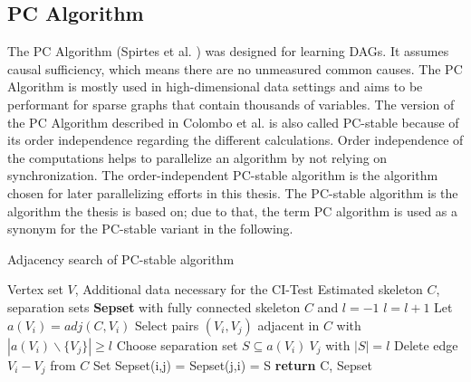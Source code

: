 \subsection{PC Algorithm}
The PC Algorithm (Spirtes et al. \cite{spirtesCausationPredictionSearch1993}) was designed for learning DAGs. It assumes causal sufficiency, which means there are no unmeasured common causes. The PC Algorithm is mostly used in high-dimensional data settings and aims to be performant for sparse graphs that contain thousands of variables. \cite{kalischUnderstandingHumanFunctioning2010}
The version of the PC Algorithm described in Colombo et al. \cite{colomboOrderIndependentConstraintBasedCausal} is also called PC-stable because of its order independence regarding the different calculations. Order independence of the computations helps to parallelize an algorithm by not relying on synchronization. The order-independent PC-stable algorithm is the algorithm chosen for later parallelizing efforts in this thesis. The PC-stable algorithm is the algorithm the thesis is based on; due to that, the term PC algorithm is used as a synonym for the PC-stable variant in the following.

\begin{algorithm}
    \caption{Adjacency search of PC-stable algorithm \cite{colomboOrderIndependentConstraintBasedCausal}}
    \label{alg:pcstable}
    \begin{algorithmic}[1]
    \Require Vertex set $V$, Additional data necessary for the CI-Test
    \Ensure Estimated skeleton $C$, separation sets \textbf{Sepset}
    \State with fully connected skeleton $C$ and $l = -1$
    \Repeat 
        \State $l=l+1$
            \State Let $a(V_i) = adj(C,V_i)$
        \EndFor
        \Repeat
            \State Select pairs $(V_i,V_j)$ adjacent in $C$ with $|a(V_i)\backslash\{V_j\}| \geq l$
            \Repeat
                \State Choose separation set $S \subseteq a(V_i ) \ {V_j }$ with $| S | = l$
                    \State Delete edge $V_i - V_j$ from $C$
                    \State Set Sepset(i,j) = Sepset(j,i) = S
                \EndIf
    \State \textbf{return} C, Sepset
    \end{algorithmic}
\end{algorithm}

